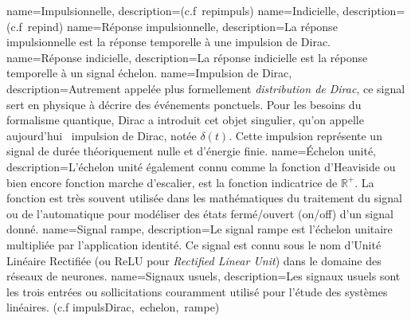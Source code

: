 %
{%
  name={Impulsionnelle},%
  description={(c.f~\gls{repimpuls})}
}
%
{%
  name={Indicielle},%
  description={(c.f~\gls{repind})}
}
%
{%
  name={Réponse impulsionnelle},%
  description={La réponse impulsionnelle est la réponse temporelle
  à une impulsion de Dirac.
  }
}
%
{%
  name={Réponse indicielle},%
  description={La réponse indicielle est la réponse temporelle
  à un signal échelon.
  }
}
%
{%
  name={Impulsion de Dirac},%
  description={Autrement appelée plus formellement \emph{distribution de Dirac}, 
               ce signal sert en physique à décrire des événements ponctuels. 
               Pour les besoins du formalisme quantique, Dirac a introduit cet objet 
               singulier, qu'on appelle aujourd'hui \og~impulsion de Dirac\fg, notée $\delta(t)$. 
               Cette impulsion représente un signal de durée théoriquement nulle 
               et d'énergie finie.}
}
%
{%
  name={Échelon unité},%
  description={L'échelon unité également connu comme 
              la fonction d'Heaviside ou bien encore fonction marche 
              d'escalier, est la fonction indicatrice de $\mathbb{R}^+$.
              La fonction est très souvent utilisée dans les mathématiques 
              du traitement du signal ou de l'automatique pour modéliser 
              des états fermé/ouvert (\og on/off\fg) d'un signal donné.}
}
%
{%
  name={Signal rampe},%
  description={Le signal rampe est l'échelon unitaire multipliée par 
               l'application identité. Ce signal est connu sous le 
               nom d'Unité Linéaire Rectifiée 
               (ou ReLU pour \emph{Rectified Linear Unit}) dans
               le domaine des réseaux de neurones.}
}
%
{%
  name={Signaux usuels},%
  description={Les signaux usuels sont les trois entrées ou sollicitations
              couramment utilisé pour l'étude des systèmes linéaires. 
              (c.f \gls{impulsDirac},~\gls{echelon},~\gls{rampe})}
}
